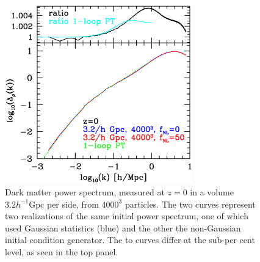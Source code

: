 \begin{figure}%
  \begin{center}
    \includegraphics[width=3.2in]{graphs/dm_power_z0_fNL0_50_w_1loop_PT.eps}
  \caption{ Dark matter power spectrum, measured at $z=0$ in a volume $3.2 h^{-1}\mbox{Gpc}$ per side,
  from $4000^3$ particles. The two curves represent two realizations of the same initial power spectrum, one of which used Gaussian statistics (blue) and the other the non-Gaussian initial condition generator. The to curves differ at the sub-per cent level, as seen in the top panel.   
    \label{fig:init}}
\end{center}
\end{figure}

